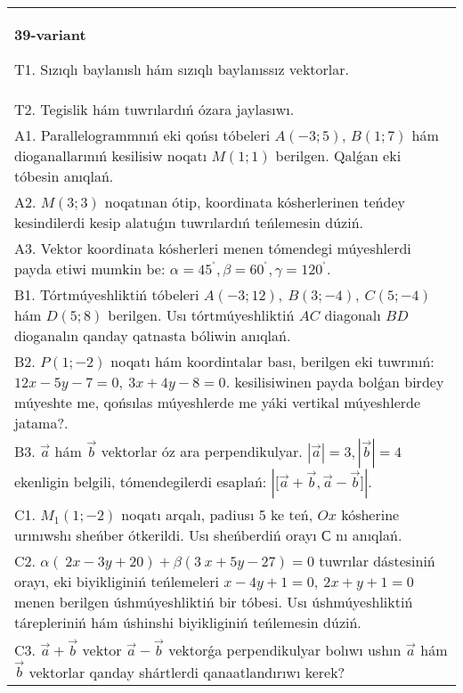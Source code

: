\documentclass{article}
\begin{document}
\begin{tabular}{m{17cm}}
\textbf{39-variant}
\newline

T1. 
Sızıqlı baylanıslı hám sızıqlı baylanıssız vektorlar.
 \\
T2. 
Tegislik hám tuwrılardıń ózara jaylasıwı.
 \\
A1. 
Parallelogrammnıń eki qońsı tóbeleri $A(-3;5)$, $B(1;7)$
hám dioganallarınıń kesilisiw noqatı $M(1;1)$ berilgen. Qalǵan eki
tóbesin anıqlań.
 \\
A2. 
$M(3;3)$ noqatınan ótip, koordinata kósherlerinen teńdey
kesindilerdi kesip alatuǵın tuwrılardıń teńlemesin dúziń.
 \\
A3. Vektor koordinata kósherleri menen tómendegi múyeshlerdi payda etiwi mumkin be:
$\alpha = 45^{{^\circ}},\beta = 60^{{^\circ}},\gamma = 120^{{^\circ}}$. 
 \\
B1. 
Tórtmúyeshliktiń tóbeleri
\(A(-3;12),\ B(3;-4),\ C(5;-4)\) hám \(D(5;8)\) berilgen. Usı
tórtmúyeshliktiń $AC$ diagonalı $BD$ dioganalın qanday
qatnasta bóliwin anıqlań.
 \\
B2. 
\(P(1;-2)\) noqatı hám koordintalar bası, berilgen eki
tuwrınıń: $12x-5y-7=0,\ 3x+4y-8=0$.
kesilisiwinen payda bolǵan birdey múyeshte me, qońsılas múyeshlerde me yáki vertikal
múyeshlerde jatama?.
 \\
B3. 
$\vec{a}$ hám $\vec{b}$ vektorlar óz ara perpendikulyar. $|\vec{a}| = 3,|\vec{b}| = 4$ ekenligin belgili, tómendegilerdi esaplań: 
$|\lbrack\vec{a} + \vec{b},\vec{a} - \vec{b}\rbrack|$. 
 \\
C1. 
\(M_{1}(1; - 2)\) noqatı arqalı, padiusı 5 ke teń,
$Ox$ kósherine urınıwshı sheńber ótkerildi. Usı sheńberdiń orayı
$С$ nı anıqlań.
 \\
C2. 
\(\alpha (\ 2x - 3y + 20) + \beta(3\ x + 5y - 27) = 0\) tuwrılar
dástesiniń orayı, eki biyikliginiń teńlemeleri
\(x - 4y + 1 = 0,\ 2x + y + 1 = 0\) menen berilgen úshmúyeshliktiń bir
tóbesi. Usı úshmúyeshliktiń tárepleriniń hám úshinshi biyikliginiń
teńlemesin dúziń. \\
C3. 
\(\vec{a} + \vec{b}\) vektor \(\vec{a} - \vec{b}\) vektorǵa perpendikulyar bolıwı ushın \(\vec{a}\) hám \(\vec{b}\) vektorlar qanday shártlerdi qanaatlandırıwı kerek?
 \\

\end{tabular}
\vspace{1cm}
\end{document}
